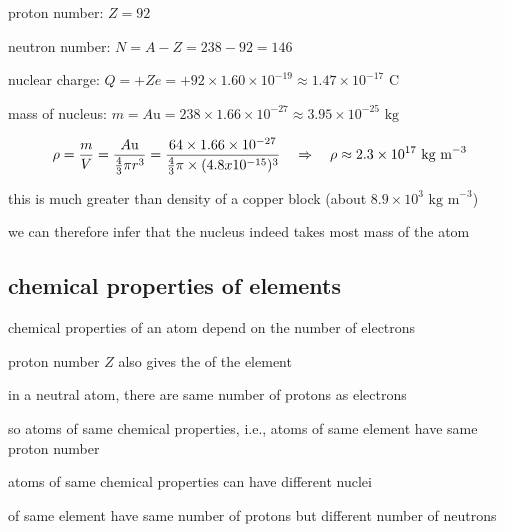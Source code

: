 
\begin{soln} proton number: $Z=92$

neutron number: $N=A-Z=238-92=146$

nuclear charge: $Q=+Ze=+92\times1.60\times10^{-19}\approx1.47\times10^{-17}\text{ C}$

mass of nucleus: $m=A\text{u} = 238 \times 1.66\times10^{-27} \approx 3.95 \times 10^{-25}\text{ kg}$ \eoe



\solc\begin{equation*}
	\rho = \frac{m}{V} = \frac{A\text{u}}{\frac{4}{3}\pi r^3} = \frac{64 \times 1.66\times10^{-27}}{\frac{4}{3}\pi \times (4.8x10^{-15})^3} \quad \Rightarrow \quad \rho \approx 2.3 \times 10^{17} \text{ kg m}^{-3}
\end{equation*}

this is much greater than density of a copper block (about $8.9 \times  10^3 \text{ kg m}^{-3}$)

we can therefore infer that the nucleus indeed takes most mass of the atom \end{soln}


\subsection{chemical properties of elements}

chemical properties of an atom depend on the number of electrons

\cmt proton number $Z$ also gives the  of the element

in a neutral atom, there are same number of protons as electrons

so atoms of same chemical properties, i.e., atoms of same element have same proton number

\cmt atoms of same chemical properties can have different nuclei

 of same element have same number of protons but different number of neutrons






